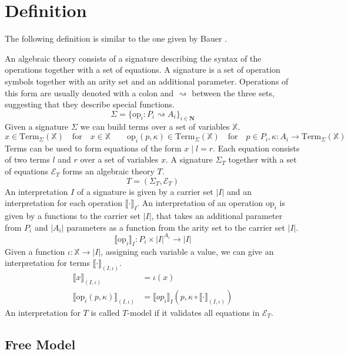 \section{Definition}
\label{fo-definition}

The following definition is similar to the one given by Bauer
\cite{DBLP:journals/corr/abs-1807-05923}.

An algebraic theory consists of a signature describing the syntax of the
operations together with a set of equations.
A signature is a set of operation symbols together with an arity set and an
additional parameter.
Operations of this form are usually denoted with a colon and $\rightsquigarrow$
between the three sets, suggesting that they describe special functions.
\[
  \Sigma = \{ \mathrm{op}_i : P_i \rightsquigarrow A_i  \}_{i\in \mathbf{N}}
\]
Given a signature $\Sigma$ we can build terms over a set of variables $\mathbb{X}$.
\[
  x \in \mathrm{Term}_\Sigma(\mathbb{X}) \quad\text{for}\quad x\in\mathbb{X} \qquad
  \mathrm{op}_i(p, \kappa) \in \mathrm{Term}_\Sigma(\mathbb{X}) \quad\text{for}\quad
  p\in P_i, \kappa : A_i \rightarrow \mathrm{Term}_\Sigma(\mathbb{X})
\]
Terms can be used to form equations of the form $x\;|\;l=r$.
Each equation consists of two terms $l$ and $r$ over a set of variables $x$.
A signature $\Sigma_T$ together with a set of equations $\mathcal{E}_T$ forms an
algebraic theory $T$.
\[
  T = (\Sigma_T, \mathcal{E}_T)
\]
An interpretation $I$ of a signature is given by a carrier set $|I|$ and an
interpretation for each operation $\lBrack\cdot\rBrack_I$.
An interpretation of an operation $\mathrm{op}_i$ is given by a functions to the
carrier set $|I|$, that takes an additional parameter from $P_i$ and $|A_i|$
parameters as a function from the arity set to the carrier set $|I|$.
\[
  \lBrack \mathrm{op}_i \rBrack_I : P_i \times |I|^{A_i} \rightarrow |I|
\]
Given a function $\iota : \mathbb{X} \rightarrow |I|$, assigning each variable
a value, we can give an interpretation for terms $\lBrack\cdot\rBrack_{(I,\iota)}$.
\begin{align*}
  \lBrack x \rBrack_{(I,\iota)} &= \iota(x) \\
  \lBrack \mathrm{op}_i(p, \kappa)\rBrack_{(I,\iota)} &= \lBrack op_i \rBrack_I (p, \kappa \circ \lBrack\cdot\rBrack_{(I, \iota)})
\end{align*}
An interpretation for $T$ is called $T$-model if it validates all equations in $\mathcal{E}_T$.

\subsection{Free Model}

